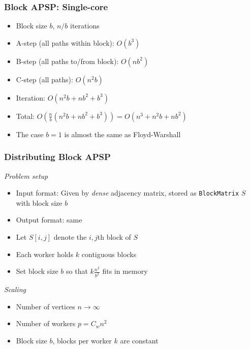 \documentclass{beamer}
\begin{document}
\begin{frame}
\frametitle{Block APSP: Single-core}
\begin{itemize}
\item Block size $b$, $n/b$ iterations 
\item A-step (all paths within block): $O(b^3)$
\item B-step (all paths to/from block): $O(nb^2)$
\item C-step (all paths): $O(n^2b)$
\item Iteration: $O(n^2 b + nb^2 + b^3)$
\item Total: $O(\frac{n}{b} (n^2 b + nb^2 + b^3)) = O(n^3 + n^2 b + nb^2)$
\item The case $b = 1$ is almost the same as Floyd-Warshall
\end{itemize}
\end{frame}

\begin{frame}
\frametitle{Distributing Block APSP}
\emph{Problem setup}
\begin{itemize}
\item Input format: Given by \emph{dense} adjacency matrix, stored as {\tt BlockMatrix} $S$ with block size $b$
\item Output format: same
\item Let $S[i, j]$ denote the $i, j$th block of $S$
\item Each worker holds $k$ contiguous blocks
\item Set block size $b$ so that $k\frac{n^2}{b^2}$ fits in memory
\end{itemize}
\emph{Scaling}
\begin{itemize}
\item Number of vertices $n \to \infty$
\item Number of workers $p = C_w n^2$
\item Block size $b$, blocks per worker $k$ are constant
\end{itemize}
\end{frame}
\end{document}
